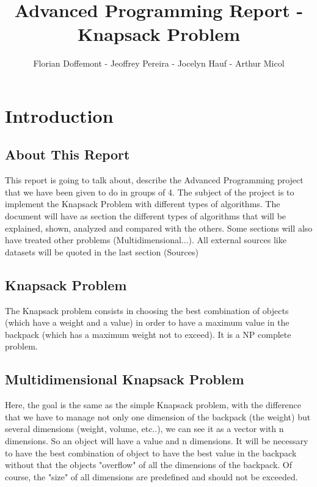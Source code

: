 \documentclass[12pt]{article}
\begin{document}
\title{Advanced Programming Report - Knapsack Problem}
\author{Florian Doffemont - Jeoffrey Pereira - Jocelyn Hauf - Arthur Micol}
\date{}

\maketitle

\tableofcontents

\section{Introduction}

    \subsection{About This Report}
        This report is going to talk about, describe the Advanced Programming project that we have been given to do in groups of 4. The subject of the project is to implement the Knapsack Problem with different types of algorithms. The document will have as section the different types of algorithms that will be explained, shown, analyzed and compared with the others. Some sections will also have treated other problems (Multidimensional...). All external sources like datasets will be quoted in the last section (Sources)
    
    \subsection{Knapsack Problem}
        The Knapsack problem consists in choosing the best combination of objects (which have a weight and a value) in order to have a maximum value in the backpack (which has a maximum weight not to exceed). It is a NP complete problem.
    
    \subsection{Multidimensional Knapsack Problem}
        Here, the goal is the same as the simple Knapsack problem, with the difference that we have to manage not only one dimension of the backpack (the weight) but several dimensions (weight, volume, etc..), we can see it as a vector with n dimensions. So an object will have a value and n dimensions. It will be necessary to have the best combination of object to have the best value in the backpack without that the objects "overflow" of all the dimensions of the backpack. Of course, the "size" of all dimensions are predefined and should not be exceeded.
    
\end{document}

